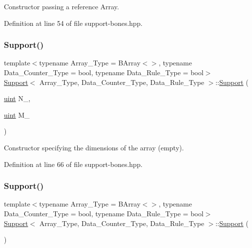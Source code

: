 Constructor passing a reference Array. 



Definition at line 54 of file support-\/bones.\+hpp.

\mbox{\label{class_support_a1f6a7ae36567effe999602df879321cd}} 
\subsubsection{\texorpdfstring{Support()}{Support()}\hspace{0.1cm}{\footnotesize\ttfamily [2/3]}}
{\footnotesize\ttfamily template$<$typename Array\+\_\+\+Type = B\+Array$<$$>$, typename Data\+\_\+\+Counter\+\_\+\+Type = bool, typename Data\+\_\+\+Rule\+\_\+\+Type = bool$>$ \\
\hyperlink{class_support}{Support}$<$ Array\+\_\+\+Type, Data\+\_\+\+Counter\+\_\+\+Type, Data\+\_\+\+Rule\+\_\+\+Type $>$\+::\hyperlink{class_support}{Support} (\begin{DoxyParamCaption}\item[{\hyperlink{typedefs_8hpp_a91ad9478d81a7aaf2593e8d9c3d06a14}{uint}}]{N\+\_\+,  }\item[{\hyperlink{typedefs_8hpp_a91ad9478d81a7aaf2593e8d9c3d06a14}{uint}}]{M\+\_\+ }\end{DoxyParamCaption})\hspace{0.3cm}{\ttfamily [inline]}}



Constructor specifying the dimensions of the array (empty). 



Definition at line 66 of file support-\/bones.\+hpp.

\mbox{\label{class_support_a489bf1d96a2ae1e8494eb94d8d366e3f}} 
\subsubsection{\texorpdfstring{Support()}{Support()}\hspace{0.1cm}{\footnotesize\ttfamily [3/3]}}
{\footnotesize\ttfamily template$<$typename Array\+\_\+\+Type = B\+Array$<$$>$, typename Data\+\_\+\+Counter\+\_\+\+Type = bool, typename Data\+\_\+\+Rule\+\_\+\+Type = bool$>$ \\
\hyperlink{class_support}{Support}$<$ Array\+\_\+\+Type, Data\+\_\+\+Counter\+\_\+\+Type, Data\+\_\+\+Rule\+\_\+\+Type $>$\+::\hyperlink{class_support}{Support} (\begin{DoxyParamCaption}{ }\end{DoxyParamCaption})\hspace{0.3cm}{\ttfamily [inline]}}



